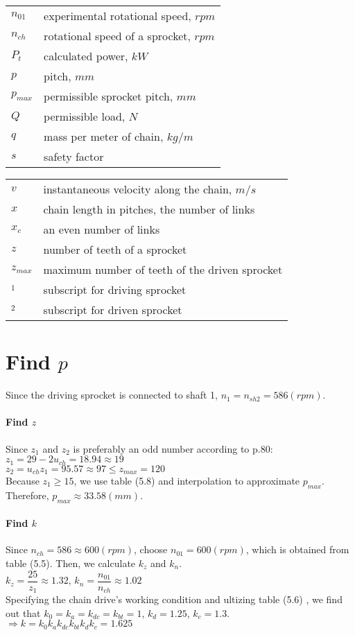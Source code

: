 \begin{tabular}[t]{lp{6.5cm}}
	$ n_{01} $ & experimental rotational speed, $ \unit{rpm} $\\
	$ n_{ch} $ & rotational speed of a sprocket, $ \unit{rpm} $\\
	$ P_t $ & calculated power, $ \unit{kW} $\\
	$ p $ & pitch, $ \unit{mm} $\\
	$ p_{max} $ & permissible sprocket pitch, $ \unit{mm} $\\
	$ Q $ & permissible load, $ \unit{N} $\\
	$ q $ & mass per meter of chain, $ \unit{kg/m} $\\
	$ s $ & safety factor\\
\end{tabular}
\begin{tabular}[t]{lp{6.5cm}}
	$ v $ & instantaneous velocity along the chain, $ \unit{m/s} $\\
	$ x $ & chain length in pitches, the number of links\\
	$ x_c $ & an even number of links\\
	$ z $ & number of teeth of a sprocket\\
	$ z_{max} $ & maximum number of teeth of the driven sprocket\\
	$ _1 $  & subscript for driving sprocket\\
	$ _2 $  & subscript for driven sprocket
\end{tabular}

\section{Find $ p $}
Since the driving sprocket is connected to shaft 1, $ n_1 = n_{sh2} = 586\unit{(rpm)} $.

\paragraph{Find $ z $}
Since $ z_1 $ and $ z_2 $ is preferably an odd number according to p.80:\\
$ z_1 = 29 - 2u_{ch} = 18.94 \approx 19$\\
$ z_2 = u_{ch}z_1 = 95.57 \approx 97 \leq z_{max} = 120$\\
Because $ z_1 \geq 15 $, we use table (5.8) and interpolation to approximate $ p_{max} $. Therefore, $ p_{max} \approx 33.58 \unit{(mm)} $.

\paragraph{Find $ k $}
Since $ n_{ch} = 586 \approx 600 \unit{(rpm)}$, choose $ n_{01} = 600\unit{(rpm)} $, which is obtained from table (5.5). Then, we calculate $ k_z $ and $ k_n $.\\
$ k_z = \dfrac{25}{z_1} \approx 1.32$, 
$ k_n = \dfrac{n_{01}}{n_{ch}} \approx 1.02$\\
Specifying the chain drive's working condition and ultizing table (5.6) , we find out that $ k_0=k_a=k_{dc}=k_{bt}=1 $, $ k_d=1.25 $, $ k_c=1.3 $.\\
$\Rightarrow k = k_0k_ak_{dc}k_{bt}k_dk_c = 1.625$

